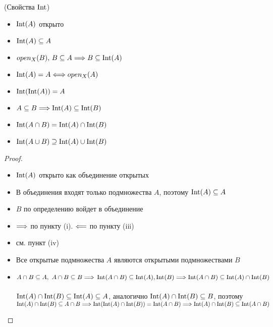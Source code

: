 \begin{theorem}(Свойства $\operatorname{Int}$)
    \enewline
    \begin{itemize}
        \item $\operatorname{Int}(A)$ открыто
        \item $\operatorname{Int}(A) \subseteq A$
        \item $open_X(B),\, B \subseteq A \Longrightarrow B \subseteq \operatorname{Int}(A)$
        \item $\operatorname{Int}(A) = A \Longleftrightarrow open_X(A)$
        \item $\operatorname{Int}(\operatorname{Int}(A)) = A$
        \item $A \subseteq B \Longrightarrow \operatorname{Int}(A) \subseteq \operatorname{Int}(B)$
        \item $\operatorname{Int}(A \cap B) = \operatorname{Int}(A) \cap \operatorname{Int}(B)$
        \item $\operatorname{Int}(A \cup B) \supseteq \operatorname{Int}(A) \cup \operatorname{Int}(B)$
    \end{itemize}
\end{theorem}
\begin{proof}
    \enewline
    \begin{itemize}
        \item $\operatorname{Int}(A)$ открыто как объединение открытых
        \item В объединения входят только подмножества $A$, поэтому
        $\operatorname{Int}(A) \subseteq A$
        \item $B$ по определению войдет в объединение
        \item $\Longrightarrow$ по пункту (i). $\Longleftarrow$ по пункту (iii)
        \item см. пункт (iv)
        \item Все открытые подмножества $A$ являются открытыми
        подмножествами $B$
        \item $A \cap B \subseteq A,~ A \cap B \subseteq B \Longrightarrow \\
        \operatorname{Int}(A \cap B) \subseteq \operatorname{Int}(A), \operatorname{Int}(B) \Longrightarrow \operatorname{Int}(A \cap B) \subseteq
        \operatorname{Int}(A) \cap \operatorname{Int}(B)$ \\ \\
        $\operatorname{Int}(A) \cap \operatorname{Int}(B) \subseteq \operatorname{Int}(A) \subseteq A$, аналогично
        $\operatorname{Int}(A) \cap \operatorname{Int}(B) \subseteq B$, поэтому \\ $\operatorname{Int}(A) \cap \operatorname{Int}(B)
        \subseteq A \cap B \Longrightarrow \operatorname{Int}(\operatorname{Int}(A) \cap \operatorname{Int}(B)) = \operatorname{Int}(A \cap B) \Longrightarrow
        \operatorname{Int}(A) \cap \operatorname{Int}(B) \subseteq \operatorname{Int}(A \cap B)$
    \end{itemize}
\end{proof}

